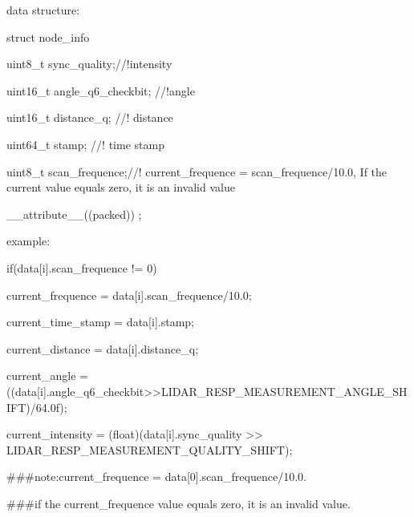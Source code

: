 data structure\+: \begin{DoxyVerb}struct node_info {

   uint8_t    sync_quality;//!intensity

   uint16_t   angle_q6_checkbit; //!angle

   uint16_t   distance_q; //! distance

   uint64_t   stamp; //! time stamp

   uint8_t    scan_frequence;//! current_frequence = scan_frequence/10.0, If the current value equals zero, it is an invalid value

} __attribute__((packed)) ;
\end{DoxyVerb}


example\+: \begin{DoxyVerb}if(data[i].scan_frequence != 0) {

    current_frequence = data[i].scan_frequence/10.0;
}

current_time_stamp = data[i].stamp;

current_distance = data[i].distance_q;

current_angle = ((data[i].angle_q6_checkbit>>LIDAR_RESP_MEASUREMENT_ANGLE_SHIFT)/64.0f);

current_intensity = (float)(data[i].sync_quality >> LIDAR_RESP_MEASUREMENT_QUALITY_SHIFT);

###note:current_frequence = data[0].scan_frequence/10.0.

###if the current_frequence value equals zero, it is an invalid value.
\end{DoxyVerb}


